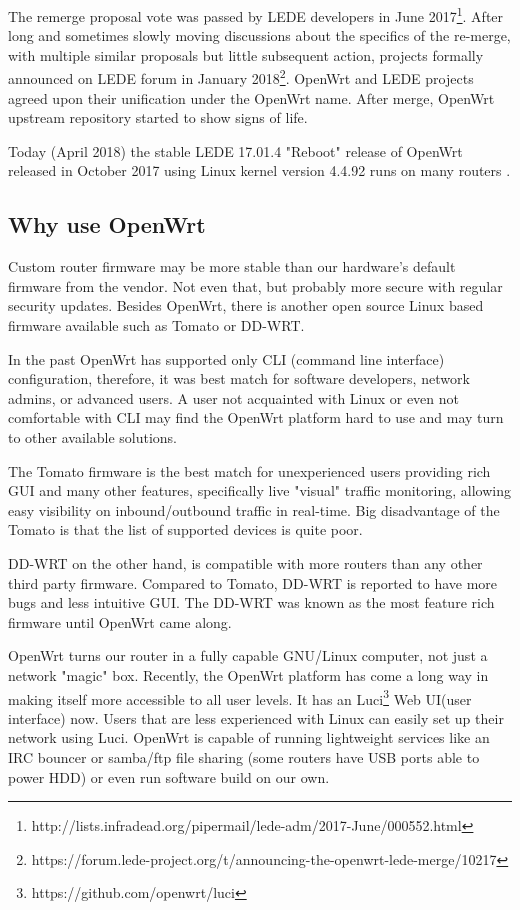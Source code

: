 The remerge proposal vote was passed by LEDE developers in June 2017\footnote{http://lists.infradead.org/pipermail/lede-adm/2017-June/000552.html}.
After long and sometimes slowly moving discussions about the specifics of the re-merge, with multiple similar proposals but little subsequent action, projects formally announced on LEDE forum in January 2018\footnote{https://forum.lede-project.org/t/announcing-the-openwrt-lede-merge/10217}.
OpenWrt and LEDE projects agreed upon their unification under the OpenWrt name.
After merge, OpenWrt upstream repository started to show signs of life.

Today (April 2018) the stable LEDE 17.01.4 "Reboot" release of OpenWrt released in October 2017 using Linux kernel version 4.4.92 runs on many routers \cite{lede_release}.



\subsection{Why use OpenWrt}

Custom router firmware may be more stable than our hardware’s default firmware from the vendor.
Not even that, but probably more secure with regular security updates.
Besides OpenWrt, there is another open source Linux based firmware available such as Tomato or DD-WRT.

In the past OpenWrt has supported only CLI (command line interface) configuration, therefore, it was best match for software developers, network admins, or advanced users.
A user not acquainted with Linux or even not comfortable with CLI may find the OpenWrt platform hard to use and may turn to other available solutions.

The Tomato firmware is the best match for unexperienced users providing rich GUI and many other features, specifically live "visual" traffic monitoring, allowing easy visibility on inbound/outbound traffic in real-time.
Big disadvantage of the Tomato is that the list of supported devices is quite poor.

DD-WRT on the other hand, is compatible with more routers than any other third party firmware.
Compared to Tomato, DD-WRT is reported to have more bugs and less intuitive GUI.
The DD-WRT was known as the most feature rich firmware until OpenWrt came along.

OpenWrt turns our router in a fully capable GNU/Linux computer, not just a network "magic" box.
Recently, the OpenWrt platform has come a long way in making itself more accessible to all user levels.
It has an Luci\footnote{https://github.com/openwrt/luci} Web UI(user interface) now.
Users that are less experienced with Linux can easily set up their network using Luci.
OpenWrt is capable of running lightweight services like an IRC bouncer or samba/ftp file sharing (some routers have USB ports able to power HDD) or even run software build on our own\cite{vpnpick}.

